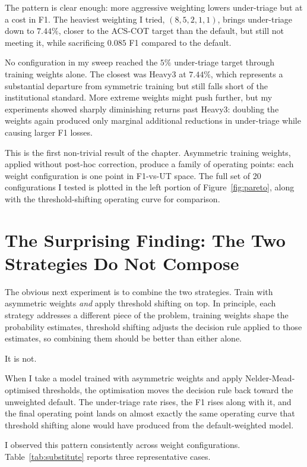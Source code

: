 The pattern is clear enough: more aggressive weighting lowers under-triage but at a cost in F1. The heaviest weighting I tried, $(8, 5, 2, 1, 1)$, brings under-triage down to $7.44\%$, closer to the ACS-COT target than the default, but still not meeting it, while sacrificing $0.085$ F1 compared to the default.

No configuration in my sweep reached the $5\%$ under-triage target through training weights alone. The closest was Heavy3 at $7.44\%$, which represents a substantial departure from symmetric training but still falls short of the institutional standard. More extreme weights might push further, but my experiments showed sharply diminishing returns past Heavy3: doubling the weights again produced only marginal additional reductions in under-triage while causing larger F1 losses.

This is the first non-trivial result of the chapter. Asymmetric training weights, applied without post-hoc correction, produce a family of operating points: each weight configuration is one point in F1-vs-UT space. The full set of 20 configurations I tested is plotted in the left portion of Figure~\ref{fig:pareto}, along with the threshold-shifting operating curve for comparison.

\section{The Surprising Finding: The Two Strategies Do Not Compose}

The obvious next experiment is to combine the two strategies. Train with asymmetric weights \emph{and} apply threshold shifting on top. In principle, each strategy addresses a different piece of the problem, training weights shape the probability estimates, threshold shifting adjusts the decision rule applied to those estimates, so combining them should be better than either alone.

It is not.

When I take a model trained with asymmetric weights and apply Nelder-Mead-optimised thresholds, the optimisation moves the decision rule back toward the unweighted default. The under-triage rate rises, the F1 rises along with it, and the final operating point lands on almost exactly the same operating curve that threshold shifting alone would have produced from the default-weighted model.

I observed this pattern consistently across weight configurations. Table~\ref{tab:substitute} reports three representative cases.


